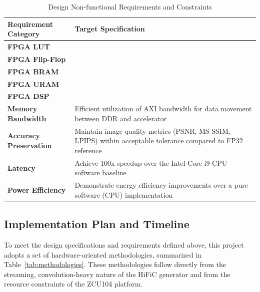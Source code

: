\begin{table}[H]
\centering
\caption{Design Non-functional Requirements and Constraints}
\label{tab:nonfunctional_req}
\begin{tabularx}{\textwidth}{|>{\raggedright\arraybackslash}p{}|X|}
\hline
\textbf{Requirement Category} & \textbf{Target Specification} \\
\hline
\textbf{FPGA LUT} &  \\
\hline
\textbf{FPGA Flip-Flop} &  \\
\hline
\textbf{FPGA BRAM} &  \\
\hline
\textbf{FPGA URAM} &  \\
\hline
\textbf{FPGA DSP} & \\
\hline
\textbf{Memory Bandwidth} & Efficient utilization of AXI bandwidth for data movement between DDR and accelerator \\
\hline
\textbf{Accuracy Preservation} & Maintain image quality metrics (PSNR, MS-SSIM, LPIPS) within acceptable tolerance compared to FP32 reference \\
\hline
\textbf{Latency} & Achieve 100x speedup over the Intel Core i9 CPU software baseline  \\
\hline
\textbf{Power Efficiency} & Demonstrate energy efficiency improvements over a pure software (CPU) implementation \\
\hline
\end{tabularx}
\end{table}

\subsection{Implementation Plan and Timeline}

To meet the design specifications and requirements defined above, this project adopts a set of hardware-oriented methodologies, summarized in Table~\ref{tab:methodologies}. These methodologies follow directly from the streaming, convolution-heavy nature of the HiFiC generator and from the resource constraints of the ZCU104 platform.

